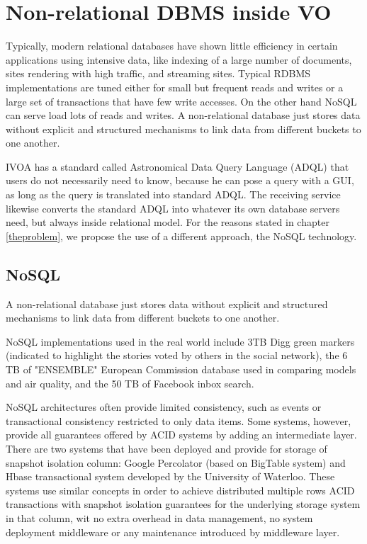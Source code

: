 \chapter{Non-relational DBMS inside VO}

Typically, modern relational databases have shown little efficiency in certain applications using intensive data, like indexing of a large number of documents, sites rendering with high traffic, and streaming sites. Typical RDBMS implementations are tuned either for small but frequent reads and writes or a large set of transactions that have few write accesses. On the other hand NoSQL can serve load lots of reads and writes. A non-relational database just stores data without explicit and structured mechanisms to link data from different buckets to one another. \newline

IVOA has a standard called Astronomical Data Query Language (ADQL) that users do not necessarily need to know, because he can pose a query with a GUI, as long as the query is translated into standard ADQL. The receiving service likewise converts the standard ADQL into whatever its own database servers need, but always inside relational model. For the reasons stated in chapter \ref{theproblem}, we propose the use of a different approach, the NoSQL technology.


\section{NoSQL}

A non-relational database just stores data without explicit and structured mechanisms to link data from different buckets to one another. \newline

NoSQL implementations used in the real world include 3TB Digg green markers (indicated to highlight the stories voted by others in the social network), the 6 TB of "ENSEMBLE" European Commission database used in comparing models and air quality, and the 50 TB of Facebook inbox search. \newline

NoSQL architectures often provide limited consistency, such as events or transactional consistency restricted to only data items. Some systems, however, provide all guarantees offered by ACID systems by adding an intermediate layer. There are two systems that have been deployed and provide for storage of snapshot isolation column: Google Percolator (based on BigTable system) and Hbase transactional system developed by the University of Waterloo. These systems use similar concepts in order to achieve distributed multiple rows ACID transactions with snapshot isolation guarantees for the underlying storage system in that column, wit no extra overhead in data management, no system deployment middleware or any maintenance introduced by middleware layer. \newline


